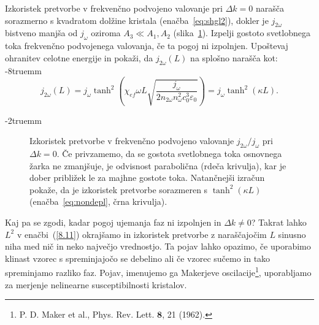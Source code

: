 \begin{naloga}
\label{deplet}
Izkoristek pretvorbe v frekvenčno podvojeno valovanje 
pri $\Delta k = 0$  narašča sorazmerno s kvadratom 
dolžine kristala (enačba~\ref{eq:shgl2}), dokler je 
$j_{2\omega}$ bistveno manjša od $j_{\omega}$ oziroma $A_3 \ll A_1, A_2$ (slika~\ref{fig:shg2dep}).
Izpelji gostoto svetlobnega toka frekvenčno podvojenega valovanja, če ta pogoj ni izpolnjen. 
Upoštevaj ohranitev celotne energije in pokaži, da $j_{2\omega}(L)$ na splošno narašča kot:
\vglue-8truemm
\begin{equation}
j_{2\omega} (L) = j_\omega \tanh^2 \left(\chi_{ef}\omega L \sqrt{\frac{j_\omega}
{2 n_{2\omega} n_\omega^2 c_0^3 \varepsilon_0}} \right) = j_\omega \tanh^2(\kappa L).
\label{eq:nondepl}
\end{equation}
\end{naloga}
\vglue-2truemm
\begin{figure}[ht]
\centering
\def\svgwidth{72truemm} 

\caption{Izkoristek pretvorbe v frekvenčno podvojeno valovanje $j_{2\omega}/j_\omega$ 
pri $\Delta k = 0$.
Če privzamemo, da se gostota svetlobnega toka osnovnega žarka ne zmanjšuje, 
je odvisnost parabolična (rdeča krivulja), kar 
je dober približek le za majhne gostote toka. Natančnejši izračun pokaže, da je izkoristek 
pretvorbe sorazmeren s $\tanh^2(\kappa L)$ (enačba~\ref{eq:nondepl}, črna krivulja).}
\label{fig:shg2dep}
\end{figure}
Kaj pa se zgodi, kadar pogoj ujemanja faz ni izpolnjen in 
 $\Delta k \neq 0$? Takrat lahko  $L^2$ v enačbi~(\ref{8.11})
okrajšamo in izkoristek pretvorbe z naraščajočim
$L$ sinusno niha med nič in neko največjo vrednostjo. Ta pojav lahko opazimo, če
uporabimo klinast vzorec s spreminjajočo se debelino ali če vzorec sučemo 
in tako spreminjamo razliko faz. Pojav, imenujemo ga Makerjeve 
oscilacije\footnote{P. D. Maker et al., Phys. Rev. Lett. $\mathbf{8}$, 21 (1962).}, 
uporabljamo za merjenje nelinearne susceptibilnosti kristalov.


